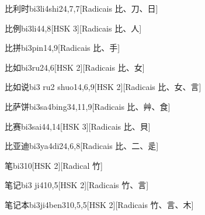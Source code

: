 \begin{entry}{比利时}{bi3li4shi2}{4,7,7}[Radicais ⽐、⼑、⽇]
\end{entry}

\begin{entry}{比例}{bi3li4}{4,8}[HSK 3][Radicais ⽐、⼈]
\end{entry}

\begin{entry}{比拼}{bi3pin1}{4,9}[Radicais ⽐、⼿]
\end{entry}

\begin{entry}{比如}{bi3ru2}{4,6}[HSK 2][Radicais ⽐、⼥]
\end{entry}

\begin{entry}{比如说}{bi3 ru2 shuo1}{4,6,9}[HSK 2][Radicais ⽐、⼥、⾔]
\end{entry}

\begin{entry}{比萨饼}{bi3sa4bing3}{4,11,9}[Radicais ⽐、⾋、⾷]
\end{entry}

\begin{entry}{比赛}{bi3sai4}{4,14}[HSK 3][Radicais ⽐、⾙]
\end{entry}

\begin{entry}{比亚迪}{bi3ya4di2}{4,6,8}[Radicais ⽐、⼆、⾡]
\end{entry}

\begin{entry}{笔}{bi3}{10}[HSK 2][Radical ⽵]
\end{entry}

\begin{entry}{笔记}{bi3 ji4}{10,5}[HSK 2][Radicais ⽵、⾔]
\end{entry}

\begin{entry}{笔记本}{bi3ji4ben3}{10,5,5}[HSK 2][Radicais ⽵、⾔、⽊]
\end{entry}

